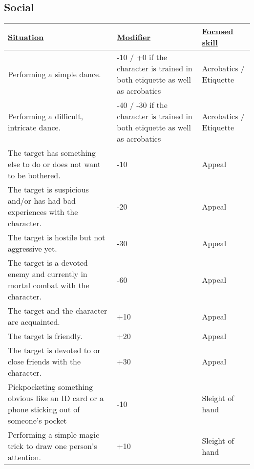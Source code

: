 \subsection{Social}
\begin{tabularx}{\textwidth}{|X|X|l|}
	\hline
	\ul{Situation} & \ul{Modifier} & \ul{Focused skill} \\ \hline
	Performing a simple dance. & -10 / +0 if the character is trained in both etiquette as well as acrobatics & Acrobatics / Etiquette \\ \hline
	Performing a difficult, intricate dance. & -40 / -30 if the character is trained in both etiquette as well as acrobatics & Acrobatics / Etiquette \\ \hline
	The target has something else to do or does not want to be bothered. & -10 & Appeal \\ \hline
	The target is suspicious and/or has had bad experiences with the character. & -20 & Appeal \\ \hline
	The target is hostile but not aggressive yet. & -30 & Appeal \\ \hline
	The target is a devoted enemy and currently in mortal combat with the character. & -60 & Appeal \\ \hline
	The target and the character are acquainted. & +10 & Appeal \\ \hline
	The target is friendly. & +20 & Appeal \\ \hline
	The target is devoted to or close friends with the character. & +30 & Appeal \\ \hline
	Pickpocketing something obvious like an ID card or a phone sticking out of someone's pocket & -10 & Sleight of hand \\ \hline
	Performing a simple magic trick to draw one person's attention. & +10 & Sleight of hand \\ \hline
\end{tabularx}

